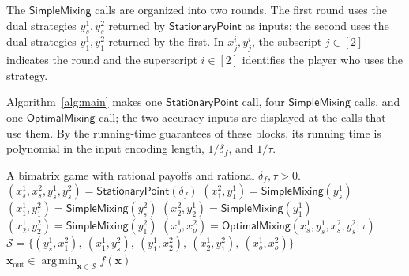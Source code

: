 \documentclass[11pt]{article}
\theoremstyle{remark}
\theoremstyle{plain}
\newcommand{\sm}{\mathsf{SimpleMixing}}
\newcommand{\om}{\mathsf{OptimalMixing}}
\newcommand{\spoint}{\mathsf{StationaryPoint}}
\begin{document}
The $\sm$ calls are organized into two rounds. The first round
uses the dual strategies $y_s^1,y_s^2$ returned by $\spoint$ as inputs; the
second uses the dual strategies $y_1^1,y_1^2$ returned by the first.
In $x_j^i,y_j^i$, the subscript $j\in[2]$ indicates the round and
the superscript $i\in[2]$ identifies the player who uses the strategy.

Algorithm~\ref{alg:main} makes one $\spoint$ call, four $\sm$ calls,
and one $\om$ call; the two accuracy inputs are displayed at the
calls that use them. By the running-time guarantees of these blocks,
its running time is polynomial in the input encoding length,
$1/\delta_f$, and $1/\tau$.

\begin{algorithm}[htbp]
\caption{Our algorithm for bimatrix games}
\label{alg:main}
\begin{algorithmic}[1]
 \Require A bimatrix game with rational payoffs and rational $\delta_f,\tau>0$.
 \State $(x_s^1,x_s^2,y_s^1,y_s^2)=\spoint(\delta_f)$
 \State $(x_1^2,y_1^1)=\sm(y_s^1)$
 \State $(x_1^1,y_1^2)=\sm(y_s^2)$
 \State $(x_2^2,y_2^1)=\sm(y_1^1)$
 \State $(x_2^1,y_2^2)=\sm(y_1^2)$
 \State $(x_o^1,x_o^2)=\om(x_s^1,y_s^1,x_s^2,y_s^2;\tau)$
 \State $\mathcal S=\{(y_s^1,x_1^2),\ (x_1^1,y_s^2),\
                   (y_1^1,x_2^2),\ (x_2^1,y_1^2),\ (x_o^1,x_o^2)\}$
 \State \Return $\boldsymbol{x}_{\mathrm{out}}\in
        \operatorname*{arg\,min}_{\boldsymbol{x}\in\mathcal S}
                        f(\boldsymbol{x})$
\end{algorithmic}
\end{algorithm}
\end{document}
